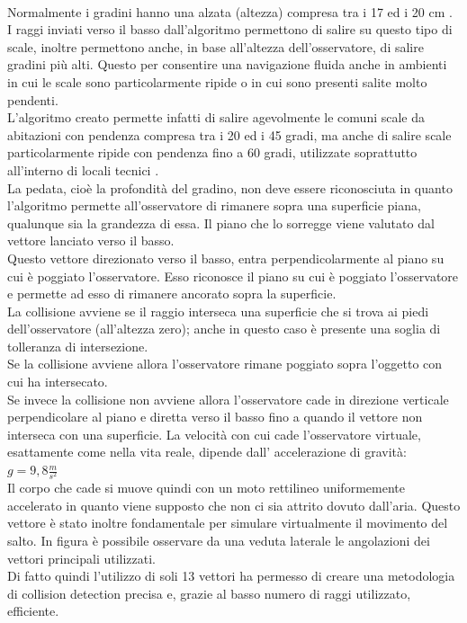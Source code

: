 \\
Normalmente i gradini hanno una alzata (altezza) compresa tra i 17 ed i 20 cm \cite{scale_pedata}.
I raggi inviati verso il basso dall’algoritmo permettono di salire su questo tipo di scale, inoltre permettono anche, in base all’altezza dell’osservatore, di salire gradini più alti. 
Questo per consentire una navigazione fluida anche in ambienti in cui le scale sono particolarmente ripide o in cui sono presenti salite molto pendenti.
\\ 
L’algoritmo creato permette infatti di salire agevolmente le comuni scale da abitazioni con pendenza compresa tra i 20 ed i 45 gradi, ma anche di salire scale particolarmente ripide con pendenza fino a 60 gradi, utilizzate soprattutto all’interno di locali tecnici \cite{scale_gradi}.
\\
La pedata, cioè la profondità del gradino, non deve essere riconosciuta in quanto l’algoritmo permette all’osservatore di rimanere sopra una superficie piana, qualunque sia la grandezza di essa. Il piano che lo sorregge viene valutato dal vettore lanciato verso il basso.
\\
Questo vettore direzionato verso il basso, entra perpendicolarmente al piano su cui è poggiato l’osservatore. Esso riconosce il piano su cui è poggiato l’osservatore  e permette ad esso di rimanere ancorato sopra la superficie.
\\
La collisione avviene se il raggio interseca una superficie che si trova ai piedi dell’osservatore (all’altezza zero); anche in questo caso è presente una soglia di tolleranza di intersezione.
\\ 
Se la collisione avviene allora l’osservatore rimane poggiato sopra l’oggetto con cui ha intersecato.
\\
Se invece la collisione non avviene allora l’osservatore cade in direzione verticale perpendicolare al piano e diretta verso il basso fino a quando il vettore non interseca con una superficie. La velocità con cui cade l’osservatore virtuale, esattamente come nella vita reale, dipende dall’ accelerazione di gravità: $g = 9,8 \frac{m}{s^2}$
\\
Il corpo che cade si muove quindi con un moto rettilineo uniformemente accelerato in quanto viene supposto che non ci sia attrito dovuto dall’aria.
Questo vettore è stato inoltre fondamentale per simulare virtualmente il movimento del salto.
In figura è possibile osservare da una veduta laterale le angolazioni dei vettori principali utilizzati.
\\
Di fatto quindi l’utilizzo di soli 13 vettori ha permesso di creare una metodologia di collision detection precisa e, grazie al basso numero di raggi utilizzato, efficiente.
